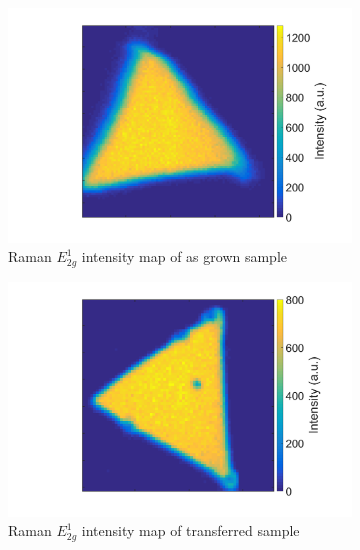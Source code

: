 \begin{figure}[H] %
	\begin{center}
		\begin{subfigure}[b]{0.4\textwidth}
			\includegraphics[scale=0.15]{Transfer/TransferRamanIntensityEMapAsgrown.png}
			\caption{Raman $E^1_{2g}$ intensity map of as grown sample}
			\label{fig:TransferRamanIntensityEMapAsgrown}
		\end{subfigure}
		\quad
		\begin{subfigure}[b]{0.4\textwidth}
			\includegraphics[scale=0.15]{Transfer/TransferRamanIntensityEMapTransferred.png}
			\caption{Raman $E^1_{2g}$ intensity map of transferred sample}
			\label{fig:TransferRamanIntensityMapTransferred}
		\end{subfigure}
		\vfill
		\begin{subfigure}[b]{0.4\textwidth}

\end{subfigure}
\end{center}
\end{figure}
